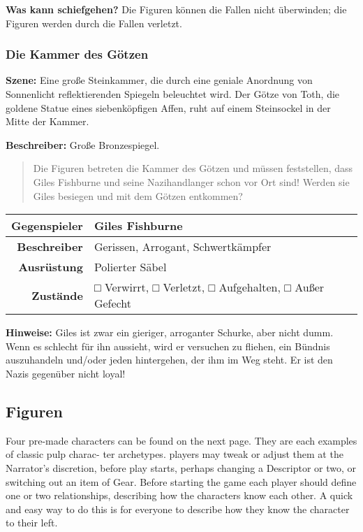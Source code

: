 \documentclass[]{article}
\begin{document}
\textbf{Was kann schiefgehen?} Die Figuren können die Fallen nicht
überwinden; die Figuren werden durch die Fallen verletzt.

\subsubsection{Die Kammer des Götzen}\label{die-kammer-des-guxf6tzen}

\textbf{Szene:} Eine große Steinkammer, die durch eine geniale Anordnung
von Sonnenlicht reflektierenden Spiegeln beleuchtet wird. Der Götze von
Toth, die goldene Statue eines siebenköpfigen Affen, ruht auf einem
Steinsockel in der Mitte der Kammer.

\textbf{Beschreiber:} Große Bronzespiegel.

\begin{quote}
Die Figuren betreten die Kammer des Götzen und müssen feststellen, dass
Giles Fishburne und seine Nazihandlanger schon vor Ort sind! Werden sie
Giles besiegen und mit dem Götzen entkommen?
\end{quote}

\begin{longtable}[]{@{}rl@{}}
\toprule
Gegenspieler & Giles Fishburne\tabularnewline
\midrule
\endhead
\textbf{Beschreiber} & Gerissen, Arrogant, Schwertkämpfer\tabularnewline
\textbf{Ausrüstung} & Polierter Säbel\tabularnewline
\textbf{Zustände} & □ Verwirrt, □ Verletzt, □ Aufgehalten, □ Außer
Gefecht\tabularnewline
\bottomrule
\end{longtable}

\textbf{Hinweise:} Giles ist zwar ein gieriger, arroganter Schurke, aber
nicht dumm. Wenn es schlecht für ihn aussieht, wird er versuchen zu
fliehen, ein Bündnis auszuhandeln und/oder jeden hintergehen, der ihm im
Weg steht. Er ist den Nazis gegenüber nicht loyal!

\subsection{Figuren}\label{figuren}

Four pre-made characters can be found on the next page. They are each
examples of classic pulp charac- ter archetypes. players may tweak or
adjust them at the Narrator's discretion, before play starts, perhaps
changing a Descriptor or two, or switching out an item of Gear. Before
starting the game each player should define one or two relationships,
describing how the characters know each other. A quick and easy way to
do this is for everyone to describe how they know the character to their
left.
\end{document}
